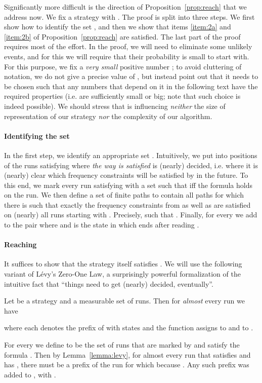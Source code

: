 \documentclass[a4paper,UKenglish]{lipics}
\begin{document}
Significantly more difficult is the direction  of Proposition~\ref{prop:reach} that we address now. We fix a strategy  with .
The proof is split into three steps. We first show how to identify the set , and then we show that items \ref{item:2a} and \ref{item:2b} of Proposition~\ref{prop:reach} are satisfied. The last part of the proof requires most of the effort.
In the proof, we will need to eliminate some unlikely events, and for this we will require that their probability is small to start with.
For this purpose, we fix a {\em very small} positive number \label{page:lambda}; to avoid cluttering of notation, we do not give
a precise value of , but instead point out that it needs to be chosen such that any numbers that depend on
it in the following text have the required properties (i.e. are sufficiently small or big; note that such choice is indeed possible). 
We should stress that  is influencing \emph{neither} the size of representation of our strategy \emph{nor} the complexity of our algorithm.
\paragraph*{Identifying the set }\label{page:sqI}

In the first step, we identify an appropriate set .
Intuitively, we put into  positions of the runs satisfying  where \emph{the way  is satisfied} is (nearly) decided, i.e. where it is (nearly) clear which frequency constraints will be satisfied by  in the future.
To this end, we mark every run  satisfying  with a set  such that  iff the formula
 holds on the run. We then define a set of finite paths  to contain all paths
 for which there is  such that exactly the frequency constraints from  as well as  are satisfied on (nearly) all runs starting with . Precisely, such that
.
Finally, for every  we add to  the pair  where  and  is the state in which  ends after reading .



\paragraph*{Reaching }

It suffices to show that the strategy  itself satisfies . We will use the following variant of L\'evy's Zero-One Law, a surprisingly powerful formalization of the intuitive fact that ``things need to get (nearly) decided, eventually''.

\begin{lemma}\label{lemma:levy}
	Let  be a strategy and  a measurable set of runs. Then for \emph{almost} every run  we have
	
	where each  denotes the prefix of  with  states and the function  assigns  to  and  to .
\end{lemma}
\noindent
For every  we define  to be the set of runs that are marked by  and satisfy the formula . 
Then by Lemma~\ref{lemma:levy}, for almost every run  that satisfies  and has , there must be a prefix  of the run for which  because . Any such prefix was added to , with .
\end{document}
